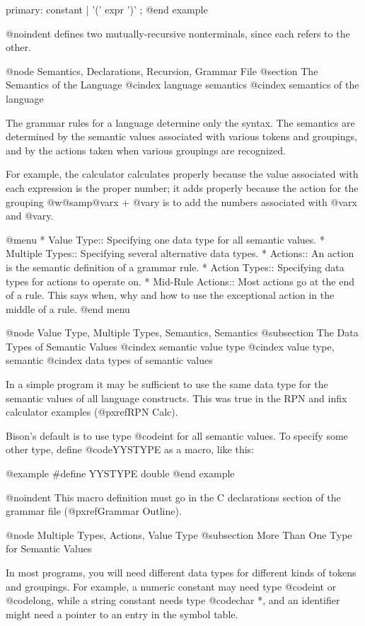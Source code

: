{{{{{{{{{{{{{{{{{{primary:  constant
        | '(' expr ')'
        ;
@end example

@noindent
defines two mutually-recursive nonterminals, since each refers to the
other.

@node Semantics, Declarations, Recursion, Grammar File
@section The Semantics of the Language
@cindex language semantics
@cindex semantics of the language

The grammar rules for a language determine only the syntax.  The semantics
are determined by the semantic values associated with various tokens and
groupings, and by the actions taken when various groupings are recognized.

For example, the calculator calculates properly because the value
associated with each expression is the proper number; it adds properly
because the action for the grouping @w{@samp{@var{x} + @var{y}}} is to add
the numbers associated with @var{x} and @var{y}.

@menu
* Value Type::       Specifying one data type for all semantic values.
* Multiple Types::   Specifying several alternative data types.
* Actions::          An action is the semantic definition of a grammar rule.
* Action Types::     Specifying data types for actions to operate on.
* Mid-Rule Actions:: Most actions go at the end of a rule.
                      This says when, why and how to use the exceptional
                      action in the middle of a rule.
@end menu

@node Value Type, Multiple Types, Semantics, Semantics
@subsection The Data Types of Semantic Values
@cindex semantic value type
@cindex value type, semantic
@cindex data types of semantic values

In a simple program it may be sufficient to use the same data type for
the semantic values of all language constructs.  This was true in the
RPN and infix calculator examples (@pxref{RPN Calc}).

Bison's default is to use type @code{int} for all semantic values.  To
specify some other type, define @code{YYSTYPE} as a macro, like this:

@example
#define YYSTYPE double
@end example

@noindent
This macro definition must go in the C declarations section of the grammar
file (@pxref{Grammar Outline}).

@node Multiple Types, Actions, Value Type
@subsection More Than One Type for Semantic Values

In most programs, you will need different data types for different kinds
of tokens and groupings.  For example, a numeric constant may need type
@code{int} or @code{long}, while a string constant needs type @code{char *},
and an identifier might need a pointer to an entry in the symbol table.

}}}}}}}}}}}}}}}}}}
